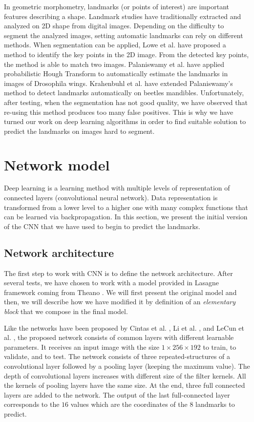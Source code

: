 \documentclass[10pt]{article}
\begin{document}
In geometric morphometry, landmarks (or points of interest) are important features describing a shape. Landmark studies have traditionally extracted and 
analyzed on 2D shape from digital images. Depending on the difficulty to segment the analyzed images, setting automatic landmarks can rely on different methods. When segmentation can be applied, Lowe et
al. \cite{lowe2004distinctive} have proposed a method to identify the
key points in the 2D image. From the detected key points, the method
is able to match two images. Palaniswamy et
al. \cite{palaniswamy2010automatic} have applied probabilistic Hough
Transform to automatically estimate the landmarks in images of
Drosophila wings. Krahenbuhl et al. \cite{le2017maelab} have extended
Palaniswamy's method to detect landmarks automatically on beetles
mandibles. Unfortunately, after testing, when the segmentation has not good quality,
we have observed that re-using this method produces too many
false positives. This is why we have turned our work on deep learning
algorithms in order to find suitable solution to predict the landmarks
on images hard to segment.


\section{Network model}
Deep learning is a learning method with multiple levels of
representation of connected layers (convolutional neural
network). Data representation is transformed from a lower level to a
higher one with many complex functions that can be learned via
backpropagation. In this section, we present the initial version of the CNN that we have used
to begin to predict the landmarks. 

\subsection{Network architecture}
\label{secmodel}
The first step to work with CNN is to define the network
architecture. After several tests, we have chosen to work with a model provided in Lasagne framework \cite{lasagne} coming from
Theano \cite{2016arXiv160502688short}. We will first present the
original model and then, we will describe how we have modified it by definition of an
\textit{elementary block} that we compose in the final model.

Like the networks have been proposed by Cintas et al. \cite{cintas2016automatic}, Li et al. \cite{li2015convolutional}, and  LeCun et al. \cite{lecun2010convolutional}, the proposed network consists of common layers
with different learnable parameters. It receives an input image with
the size  $1 \times 256 \times 192$ to train, to validate, and to
test. The network consists of three repeated-structures of a convolutional layer
followed by a pooling layer (keeping the maximum value). The depth of convolutional layers increases with different size of the filter kernels.
All the kernels of pooling layers have the same size. 
At the end, three full connected layers are added to the
network. The output of the last full-connected
layer corresponds to the $16$ values which are the coordinates of the
$8$ landmarks to predict.
\end{document}
